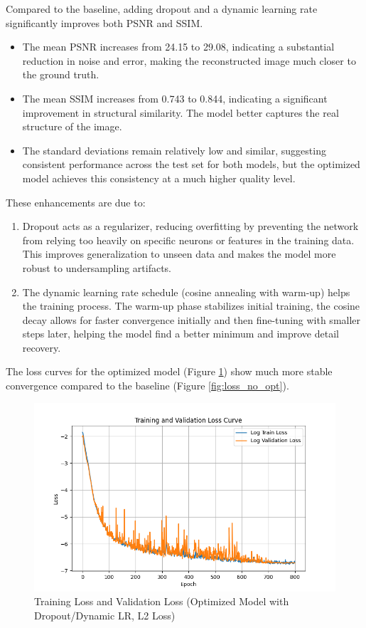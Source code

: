 \documentclass{article}
\begin{document}
Compared to the baseline, adding dropout and a dynamic learning rate significantly improves both PSNR and SSIM.
\begin{itemize}
  \item The mean PSNR increases from 24.15 to 29.08, indicating a substantial reduction in noise and error, making the reconstructed image much closer to the ground truth.
  \item The mean SSIM increases from 0.743 to 0.844, indicating a significant improvement in structural similarity. The model better captures the real structure of the image.
  \item The standard deviations remain relatively low and similar, suggesting consistent performance across the test set for both models, but the optimized model achieves this consistency at a much higher quality level.
\end{itemize}
These enhancements are due to:
\begin{enumerate}
  \item Dropout acts as a regularizer, reducing overfitting by preventing the network from relying too heavily on specific neurons or features in the training data. This improves generalization to unseen data and makes the model more robust to undersampling artifacts.
  \item The dynamic learning rate schedule (cosine annealing with warm-up) helps the training process. The warm-up phase stabilizes initial training, the cosine decay allows for faster convergence initially and then fine-tuning with smaller steps later, helping the model find a better minimum and improve detail recovery.
\end{enumerate}
The loss curves for the optimized model (Figure \ref{fig:loss_opt}) show much more stable convergence compared to the baseline (Figure \ref{fig:loss_no_opt}).

\begin{figure}[H]
  \centering
  \includegraphics[width=\linewidth]{../assets/Training Loss and Validation Loss.png}
  \caption{Training Loss and Validation Loss (Optimized Model with Dropout/Dynamic LR, L2 Loss)}
  \label{fig:loss_opt}
\end{figure}
\end{document}
